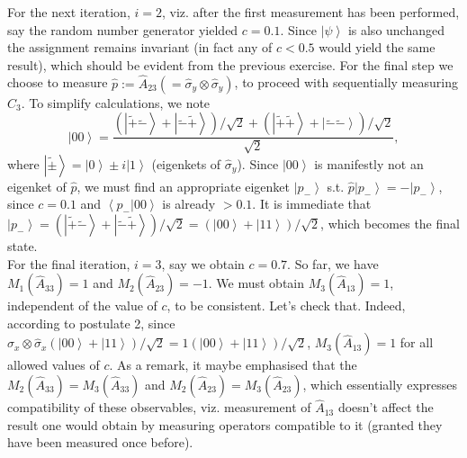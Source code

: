 \documentclass[british,aps,prl,superscriptaddress,nofootinbib,times,reprint]{revtex4-1}
\theoremstyle{plain}
\theoremstyle{plain}
\theoremstyle{definition}
\theoremstyle{remark}
\theoremstyle{remark}
\theoremstyle{remark}
\theoremstyle{plain}
\theoremstyle{plain}
\theoremstyle{plain}
\theoremstyle{definition}
\theoremstyle{definition}
\begin{document}
For the next iteration, $i=2$, viz.
after the first measurement has been performed,
say the random number generator yielded $c=0.1$.
Since $\left|\psi\right\rangle $ is also unchanged
the assignment remains invariant (in fact any of
$c<0.5$ would yield the same result), which should
be evident from the previous exercise. For the
final step we choose to measure
$\hat p := \hat{A}_{23}(=\hat{\sigma}_{y}\otimes\hat{\sigma}_{y})$,
to proceed with sequentially measuring
$\hat{C}_{3}$. To simplify calculations, we note
\[ \left|00\right\rangle
=\frac{(\left|\tilde{+}\tilde{-}\right\rangle
+\left|\tilde{-}\tilde{+}\right\rangle
)/\sqrt{2}+(\left|\tilde{+}\tilde{+}\right\rangle
+\left|\tilde{-}\tilde{-}\right\rangle
)/\sqrt{2}}{\sqrt{2}}, \] where
$\left|\tilde{\pm}\right\rangle
=\left|0\right\rangle \pm i\left|1\right\rangle $
(eigenkets of $\hat{\sigma}_{y}$). Since
$\left|00\right\rangle $ is manifestly not an
eigenket of $\hat{p}$, we must find an appropriate
eigenket $\left|p_{-}\right\rangle $ s.t.
$\hat{p}\left|p_{-}\right\rangle
=-\left|p_{-}\right\rangle $, since $c=0.1$ and
$\left\langle p_{-}|00\right\rangle $ is already
$>0.1$. It is immediate that
$\left|p_{-}\right\rangle
=\left(\left|\tilde{+}\tilde{-}\right\rangle
+\left|\tilde{-}\tilde{+}\right\rangle
\right)/\sqrt{2}=\left(\left|00\right\rangle
+\left|11\right\rangle \right)/\sqrt{2}$, which
becomes the final state. \\ For the final
iteration, $i=3$, say we obtain $c=0.7$. So far,
we have $M_{1}(\hat{A}_{33})=1$ and
$M_{2}(\hat{A}_{23})=-1$. We must obtain
$M_{3}(\hat{A}_{13})=1$, independent of the value
of $c$, to be consistent. Let's check that.
Indeed, according to postulate 2, since
$\hat{\sigma}_{x}\otimes\hat{\sigma}_{x}\left(\left|00\right\rangle
+\left|11\right\rangle
\right)/\sqrt{2}=1\left(\left|00\right\rangle
+\left|11\right\rangle \right)/\sqrt{2}$,
$M_{3}(\hat{A}_{13})=1$ for all allowed values of
$c$. As a remark, it maybe emphasised that the
$M_{2}(\hat{A}_{33})=M_{3}(\hat{A}_{33})$ and
$M_{2}(\hat{A}_{23})=M_{3}(\hat{A}_{23})$, which
essentially expresses compatibility of these
observables, viz. measurement of $\hat{A}_{13}$
doesn't affect the result one would obtain by
measuring operators compatible to it (granted they
have been measured once before).
\end{document}
